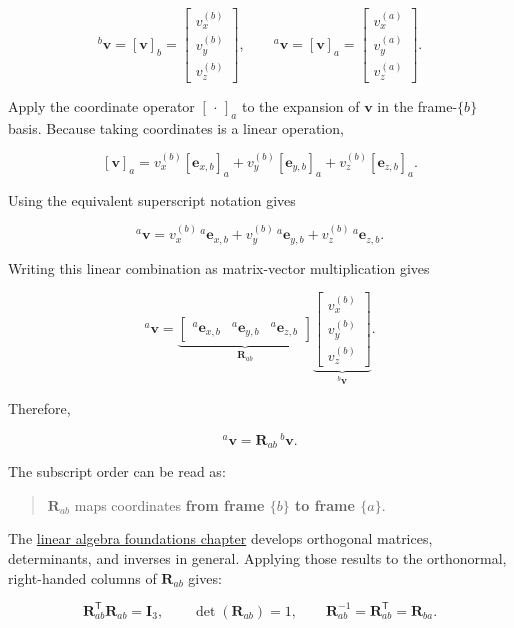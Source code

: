 \documentclass[
  australian,
  12pt,
  letterpaper,
  DIV=11,
  numbers=noendperiod,
  twoside]{scrreprt}
\begin{document}
\[
{}^{b}\mathbf v
=
[\mathbf v]_b
=
\begin{bmatrix}
v_x^{(b)}\\
v_y^{(b)}\\
v_z^{(b)}
\end{bmatrix},
\qquad
{}^{a}\mathbf v
=
[\mathbf v]_a
=
\begin{bmatrix}
v_x^{(a)}\\
v_y^{(a)}\\
v_z^{(a)}
\end{bmatrix}.
\]

Apply the coordinate operator \([\,\cdot\,]_a\) to the expansion of
\(\mathbf v\) in the frame-\(\{b\}\) basis. Because taking coordinates
is a linear operation,

\[
[\mathbf v]_a
=
v_x^{(b)}[\mathbf e_{x,b}]_a
+
v_y^{(b)}[\mathbf e_{y,b}]_a
+
v_z^{(b)}[\mathbf e_{z,b}]_a.
\]

Using the equivalent superscript notation gives

\[
{}^{a}\mathbf v
=
v_x^{(b)}\,{}^{a}\mathbf e_{x,b}
+
v_y^{(b)}\,{}^{a}\mathbf e_{y,b}
+
v_z^{(b)}\,{}^{a}\mathbf e_{z,b}.
\]

Writing this linear combination as matrix-vector multiplication gives

\[
{}^{a}\mathbf v
=
\underbrace{
\begin{bmatrix}
{}^{a}\mathbf e_{x,b} &
{}^{a}\mathbf e_{y,b} &
{}^{a}\mathbf e_{z,b}
\end{bmatrix}
}_{\mathbf R_{ab}}
\underbrace{
\begin{bmatrix}
v_x^{(b)}\\
v_y^{(b)}\\
v_z^{(b)}
\end{bmatrix}
}_{{}^{b}\mathbf v}.
\]

Therefore,

\[
\boxed{{}^{a}\mathbf v=\mathbf R_{ab}\,{}^{b}\mathbf v}.
\]

The subscript order can be read as:

\begin{quote}
\(\mathbf{R}_{ab}\) maps coordinates \textbf{from frame \(\{b\}\) to
frame \(\{a\}\)}.
\end{quote}

The \hyperref[sec-linear-algebra-foundations]{linear algebra foundations
chapter} develops orthogonal matrices, determinants, and inverses in
general. Applying those results to the orthonormal, right-handed columns
of \(\mathbf R_{ab}\) gives:

\[
\boxed{
\mathbf{R}_{ab}^\mathsf{T}\mathbf{R}_{ab}=\mathbf{I}_3,
\qquad
\det(\mathbf{R}_{ab})=1,
\qquad
\mathbf{R}_{ab}^{-1}=\mathbf{R}_{ab}^\mathsf{T}=\mathbf{R}_{ba}
}.
\]
\end{document}
